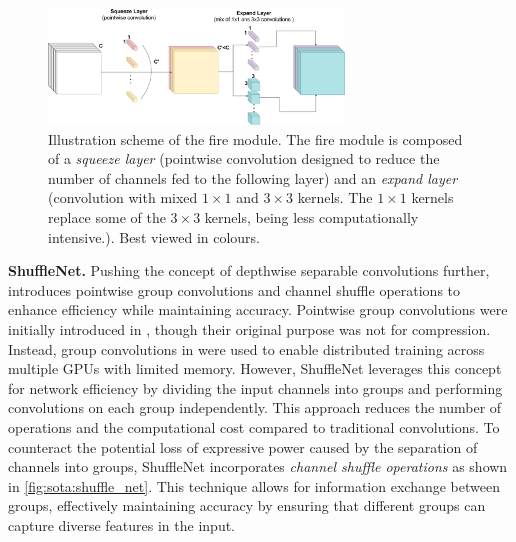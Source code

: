 \begin{figure}[htbp]
  \centering
  \includegraphics[width=0.70\textwidth]{chapter_sota/assets/fire_module.pdf}
  \caption{Illustration scheme of the fire module. The fire module is composed
    of a \emph{squeeze layer} (pointwise convolution designed to reduce the
    number of channels fed to the following layer) and an \emph{expand layer}
    (convolution with mixed $1\times1$ and $3\times3$ kernels. The $1\times1$
    kernels replace some of the $3\times3$ kernels, being less computationally
    intensive.). Best viewed in colours.}
  \label{fig:sota:fire_module}
\end{figure}



\noindent\textbf{ShuffleNet.} Pushing the concept of depthwise separable
convolutions further, \cite{ZhangShuffleNet} introduces pointwise group
convolutions and channel shuffle operations to enhance efficiency while
maintaining accuracy. Pointwise group convolutions were initially introduced in
\cite{DBLP:conf/nips/KrizhevskySH12}, though their original purpose was not for
compression. Instead, group convolutions in \cite{DBLP:conf/nips/KrizhevskySH12}
were used to enable distributed training across multiple \acp{GPU} with limited
memory. However, ShuffleNet \cite{ZhangShuffleNet} leverages this concept for
network efficiency by dividing the input channels into groups and performing
convolutions on each group independently. This approach reduces the number of
operations and the computational cost compared to traditional convolutions. To
counteract the potential loss of expressive power caused by the separation of
channels into groups, ShuffleNet incorporates \emph{channel shuffle operations}
as shown in \cref{fig:sota:shuffle_net}. This technique allows for information
exchange between groups, effectively maintaining accuracy by ensuring that
different groups can capture diverse features in the input.\\


